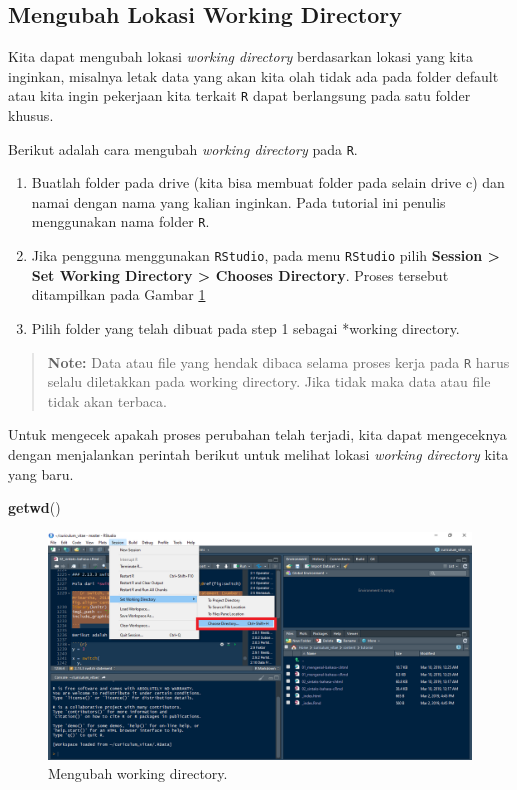 \documentclass[]{book}
\newenvironment{Shaded}{\begin{snugshade}}{\end{snugshade}}
\newcommand{\KeywordTok}[1]{\textcolor[rgb]{0.13,0.29,0.53}{\textbf{#1}}}
\newcommand{\NormalTok}[1]{#1}
\providecommand{\tightlist}{%
  \setlength{\itemsep}{0pt}\setlength{\parskip}{0pt}}
\begin{document}
\subsection{Mengubah Lokasi Working
Directory}\label{mengubah-lokasi-working-directory}

Kita dapat mengubah lokasi \emph{working directory} berdasarkan lokasi
yang kita inginkan, misalnya letak data yang akan kita olah tidak ada
pada folder default atau kita ingin pekerjaan kita terkait \texttt{R}
dapat berlangsung pada satu folder khusus.

Berikut adalah cara mengubah \emph{working directory} pada \texttt{R}.

\begin{enumerate}
\def\labelenumi{\arabic{enumi}.}
\tightlist
\item
  Buatlah folder pada drive (kita bisa membuat folder pada selain drive
  c) dan namai dengan nama yang kalian inginkan. Pada tutorial ini
  penulis menggunakan nama folder \texttt{R}.
\item
  Jika pengguna menggunakan \texttt{RStudio}, pada menu \texttt{RStudio}
  pilih \textbf{Session \textgreater{} Set Working Directory
  \textgreater{} Chooses Directory}. Proses tersebut ditampilkan pada
  Gambar \ref{fig:working}
\item
  Pilih folder yang telah dibuat pada step 1 sebagai *working directory.
\end{enumerate}

\begin{quote}
\textbf{Note: } Data atau file yang hendak dibaca selama proses kerja
pada \texttt{R} harus selalu diletakkan pada working directory. Jika
tidak maka data atau file tidak akan terbaca.
\end{quote}

Untuk mengecek apakah proses perubahan telah terjadi, kita dapat
mengeceknya dengan menjalankan perintah berikut untuk melihat lokasi
\emph{working directory} kita yang baru.

\begin{Shaded}
\begin{Highlighting}[]
\KeywordTok{getwd}\NormalTok{()}
\end{Highlighting}
\end{Shaded}

\begin{figure}

{\centering \includegraphics[width=0.8\linewidth]{working} 

}

\caption{Mengubah working directory.}\label{fig:working}
\end{figure}
\end{document}
